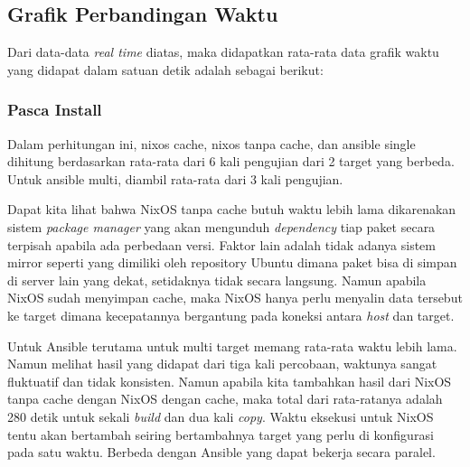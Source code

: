 \documentclass[10pt,twoside]{report}
\begin{document}
\begin{adjustwidth}{20pt}{}
	\subsection{Grafik Perbandingan Waktu}
	\begin{adjustwidth}{20pt}{}
		Dari data-data \textit{real time} diatas, maka didapatkan
		rata-rata data grafik waktu yang didapat dalam satuan
		detik adalah sebagai berikut:
	\end{adjustwidth}
	\subsubsection{Pasca Install}
	\begin{adjustwidth}{20pt}{}
		Dalam perhitungan ini, nixos cache, nixos tanpa cache, dan ansible single
		dihitung berdasarkan rata-rata dari 6 kali pengujian dari 2 target yang berbeda.
		Untuk ansible multi, diambil rata-rata dari 3 kali pengujian.
	\end{adjustwidth}
	\begin{adjustwidth}{20pt}{}
		Dapat kita lihat bahwa NixOS tanpa cache butuh waktu lebih lama dikarenakan
		sistem \textit{package manager} yang akan mengunduh \textit{dependency} tiap
		paket secara terpisah apabila ada perbedaan versi. Faktor lain adalah
		tidak adanya sistem mirror seperti yang dimiliki oleh
		repository Ubuntu dimana paket bisa di simpan di server lain yang dekat, setidaknya
		tidak secara langsung.
		Namun apabila NixOS sudah menyimpan cache, maka NixOS hanya perlu menyalin
		data tersebut ke target dimana kecepatannya bergantung pada koneksi antara
		\textit{host} dan target.

		Untuk Ansible terutama untuk multi target memang rata-rata waktu lebih lama.
		Namun melihat hasil yang didapat dari tiga kali percobaan, waktunya sangat
		fluktuatif dan tidak konsisten.
		Namun apabila kita tambahkan hasil dari NixOS tanpa cache dengan NixOS
		dengan cache, maka total dari rata-ratanya adalah 280 detik untuk
		sekali \textit{build} dan dua kali \textit{copy}.
		Waktu eksekusi untuk NixOS tentu akan bertambah seiring bertambahnya
		target yang perlu di konfigurasi pada satu waktu. Berbeda dengan Ansible yang
		dapat bekerja secara paralel.


\end{adjustwidth}
\end{adjustwidth}
\end{document}
